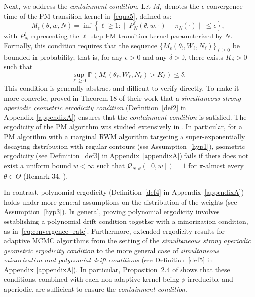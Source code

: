 \documentclass[pdflatex,sn-mathphys-num]{sn-jnl}
\renewcommand{\geq}{\geqslant}
\renewcommand{\leq}{\leqslant}
\theoremstyle{thmstyleone}
\theoremstyle{thmstyletwo}
\theoremstyle{thmstylethree}
\begin{document}
Next, we address the \textit{containment condition}. Let $M_\epsilon$ denotes the $\epsilon$-convergence time of the PM transition kernel in~\eqref{equa5}, defined as: 
\[
M_\epsilon(\theta, w, N) = \inf\left\{\ell \geq 1 : \|P_{N}^\ell(\theta, w, \cdot) - \bar\pi_N(\cdot)\| \leq \epsilon\right\},
\]
with $P_N^\ell$ representing the $\ell$-step PM transition kernel parameterized by $N$. Formally, this condition requires that the sequence $\{M_\epsilon(\theta_\ell, W_\ell, N_\ell)\}_{\ell \geq 0}$ be bounded in probability; that is, for any $\epsilon > 0$ and any $\delta > 0$, there exists $K_\delta > 0$ such that
\[
\sup_{\ell \geq 0} \mathbb{P}(M_\epsilon(\theta_\ell, W_\ell, N_\ell) > K_\delta) \leq \delta.
\]
This condition is generally abstract and difficult to verify directly. To make it more concrete, \cite{roberts_coupling_2007} proved in Theorem 18 of their work that a \textit{simultaneous strong aperiodic geometric ergodicity condition} (Definition~\ref{def2} in Appendix~\ref{appendixA}) ensures that the \textit{containment condition} is satisfied. The ergodicity of the PM algorithm was studied extensively in \cite{andrieu_convergence_2015}. In particular, for a PM algorithm with a marginal RWM algorithm targeting a super-exponentially decaying distribution with regular contours (see Assumption~\ref{hyp1}), geometric ergodicity (see Definition~\ref{def3} in Appendix~\ref{appendixA}) fails if there does not exist a uniform bound $\bar{w} < \infty$ such that $\mathcal{Q}_{N,\theta}([0, \bar{w}]) = 1$ for $\pi$-almost every $\theta \in \Theta$ (Remark 34, \cite{andrieu_convergence_2015}).

In contrast, polynomial ergodicity (Definition~\ref{def4} in Appendix~\ref{appendixA}) holds under more general assumptions on the distribution of the weights (see Assumption~\ref{hyp3}). In general, proving polynomial ergodicity involves establishing a polynomial drift condition together with a minorization condition, as in~\eqref{eq:convergence_rate}. Furthermore, \cite{atchade_limit_2010} extended ergodicity results for adaptive MCMC algorithms from the setting of the \textit{simultaneous strong aperiodic geometric ergodicity condition} to the more general case of \textit{simultaneous minorization and polynomial drift conditions} (see Definition~\ref{def5} in Appendix~\ref{appendixA}). In particular, Proposition~2.4 of \cite{atchade_limit_2010} shows that these conditions, combined with each non adaptive kernel being $\phi$-irreducible and aperiodic, are sufficient to ensure the \textit{containment condition}. 
\end{document}
